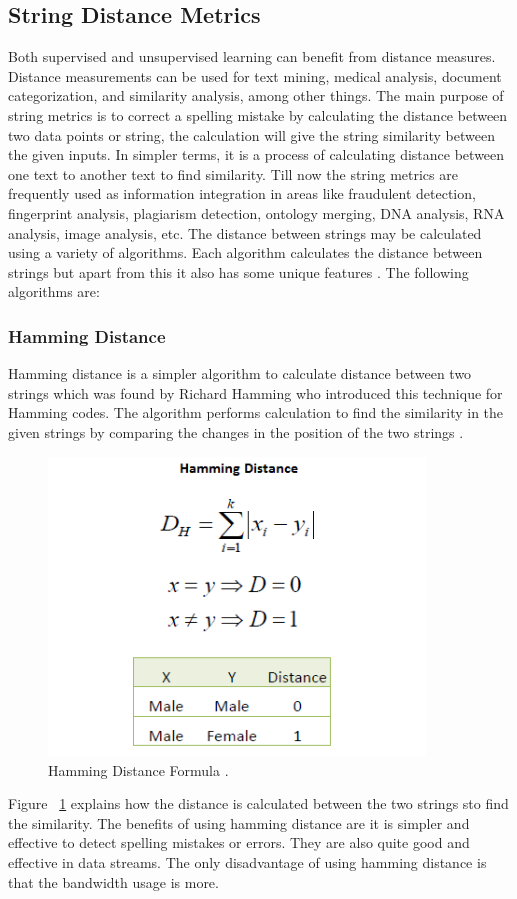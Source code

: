 \subsection{String Distance Metrics}
Both supervised and unsupervised learning can benefit from distance measures. Distance measurements can be used for text mining, medical analysis, document categorization, and similarity analysis, among other things. The main purpose of string metrics is to correct a spelling mistake by calculating the distance between two data points or string, the calculation will give the string similarity between the given inputs. In simpler terms, it is a process of calculating distance between one text to another text to find similarity. Till now the string metrics are frequently used as information integration in areas like fraudulent detection, fingerprint analysis, plagiarism detection, ontology merging, DNA analysis, RNA analysis, image analysis, etc. The distance between strings may be calculated using a variety of algorithms. Each algorithm calculates the distance between strings but apart from this it also has some unique features \cite{Wu2020}. The following algorithms are:
\subsubsection{Hamming Distance}
Hamming distance is a simpler algorithm to calculate distance between two strings which was found by Richard Hamming who introduced this technique for Hamming codes. The algorithm performs  calculation to find the similarity in the given strings by comparing the changes in the position of the two strings \cite{Tok2015}.

\begin{figure}[h!]
	\includegraphics[width=10cm]{includes/hamming.png}
	\centering
	\caption{ Hamming Distance Formula \cite{Saed2021}.}
	\label{fig:hamming}
\end{figure}
Figure ~\ref{fig:hamming} explains how the distance is calculated between the two strings sto find the similarity. The benefits of using hamming distance are it is simpler and effective to detect spelling mistakes or errors. They are also quite good and effective in data streams. The only disadvantage of using hamming distance is that the bandwidth usage is more.
